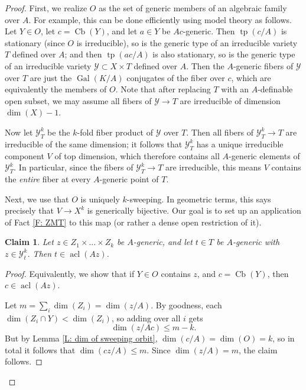 \documentclass{amsart}
\newtheorem{claim}[theorem]{Claim}
\theoremstyle{definition}
\newcommand{\acl}{\operatorname{acl}}
\newcommand{\tp}{\operatorname{tp}}
\begin{document}
\begin{proof}
    First, we realize $O$ as the set of generic members of an algebraic family over $A$. For example, this can be done efficiently using model theory as follows. Let $Y\in O$, let $c=\operatorname{Cb}(Y)$, and let $a\in Y$ be $Ac$-generic. Then $\tp(c/A)$ is stationary (since $O$ is irreducible), so is the generic type of an irreducible variety $T$ defined over $A$; and then $\tp(ac/A)$ is also stationary, so is the generic type of an irreducible variety $\mathcal Y\subset X\times T$ defined over $A$. Then the $A$-generic fibers of $\mathcal Y$ over $T$ are just the $\operatorname{Gal}(K/A)$ conjugates of the fiber over $c$, which are equivalently the members of $O$. Note that after replacing $T$ with an $A$-definable open subset, we may assume all fibers of $\mathcal Y\rightarrow T$ are irreducible of dimension $\dim(X)-1$.

    Now let $\mathcal Y^k_T$ be the $k$-fold fiber product of $\mathcal Y$ over $T$. Then all fibers of $\mathcal Y^k_T\rightarrow T$ are irreducible of the same dimension; it follows that $\mathcal Y^k_T$ has a unique irreducible component $V$ of top dimension, which therefore contains all $A$-generic elements of $\mathcal Y_T^k$. In particular, since the fibers of $\mathcal Y_T^k\rightarrow T$ are irreducible, this means $V$ contains the \textit{entire} fiber at every $A$-generic point of $T$.
    
    Next, we use that $O$ is uniquely $k$-sweeping. In geometric terms, this says precisely that $V\rightarrow X^k$ is generically bijective. Our goal is to set up an application of Fact \ref{F: ZMT} to this map (or rather a dense open restriction of it).

    \begin{claim} Let $z\in Z_1\times...\times Z_k$ be $A$-generic, and let $t\in T$ be $A$-generic with $z\in\mathcal Y_t^k$. Then $t\in\acl(Az)$.
    \end{claim}
    \begin{proof}
        Equivalently, we show that if $Y\in O$ contains $z$, and $c=\operatorname{Cb}(Y)$, then $c\in\acl(Az)$.

        Let $m=\sum_i\dim(Z_i)=\dim(z/A)$. By goodness, each $\dim(Z_i\cap Y)<\dim(Z_i)$, so adding over all $i$ gets $$\dim(z/Ac)\leq m-k.$$ But by Lemma \ref{L: dim of sweeping orbit}, $\dim(c/A)=\dim(O)=k$, so in total it follows that $\dim(cz/A)\leq m$. Since $\dim(z/A)=m$, the claim follows.
    \end{proof}
    

\end{proof}
\end{document}
